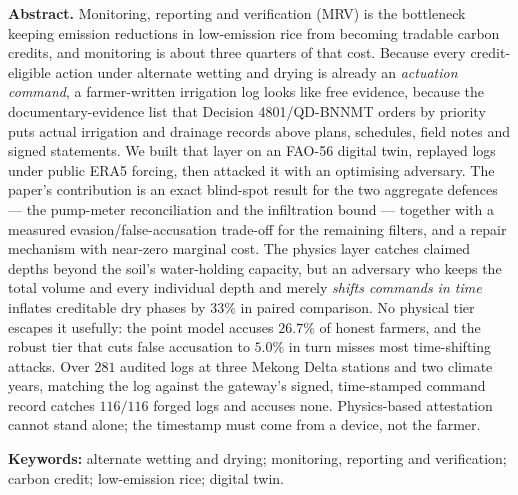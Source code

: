   \vspace{6pt}
  \begin{hujosabstract}
  \noindent\textbf{Abstract.} Monitoring, reporting and verification (MRV) is the bottleneck keeping emission
 reductions in low-emission rice from becoming tradable carbon credits, and
 monitoring is about three quarters of that cost. Because every credit-eligible
 action under alternate wetting and drying is already an \emph{actuation command},
 a farmer-written irrigation log looks like free evidence, because the documentary-evidence list that Decision 4801/QD-BNNMT orders by priority puts actual irrigation and drainage records above plans, schedules, field notes and signed statements. We built that layer on an FAO-56 digital twin, replayed logs under public ERA5 forcing, then attacked it with an optimising adversary. The paper's contribution is an exact blind-spot result for the two aggregate
 defences --- the pump-meter reconciliation and the infiltration bound --- together
 with a measured evasion/false-accusation trade-off for the remaining filters, and a
 repair mechanism with near-zero marginal cost. The physics layer catches claimed depths beyond the soil's water-holding capacity, but an adversary who keeps the
 total volume and every individual depth and merely \emph{shifts commands in time}
 inflates creditable dry phases by $33\%$ in paired comparison. No physical tier
 escapes it usefully: the point model accuses $26.7\%$ of honest farmers, and the
 robust tier that cuts false accusation to $5.0\%$ in turn misses most
 time-shifting attacks. Over $281$ audited logs at three Mekong Delta stations
 and two climate years, matching the log against the gateway's signed,
 time-stamped command record catches $116/116$ forged logs and accuses none.
 Physics-based attestation cannot stand alone; the timestamp must come from
 a device, not the farmer.

 \vspace{4pt}

 \noindent\textbf{Keywords:} alternate wetting and drying; monitoring, reporting
  and verification; carbon credit; low-emission rice; digital twin.

  \vspace{10pt}
  \end{hujosabstract}
\endgroup








